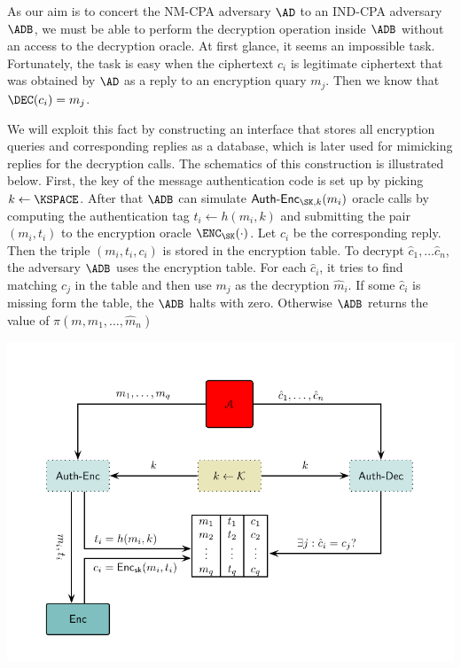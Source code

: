 \documentclass{crypto-exercise}
\newcommand{\AENC}{\mathsf{Auth\text{-}Enc}}
\begin{document}
\begin{solution}
As our aim is to concert the NM-CPA adversary $\AD$ to an IND-CPA adversary $\ADB$, we must be able to perform the decryption operation inside $\ADB$ without an access to the decryption oracle. At first glance, it seems an impossible task. Fortunately, the task is easy when the ciphertext $c_i$ is legitimate ciphertext that was obtained by $\AD$ as a reply to an encryption quary $m_j$. Then we know that $\DEC(c_i)=m_j$.

We will exploit this fact by constructing an interface that stores all encryption queries and corresponding replies as a database, which is later used for mimicking replies for the decryption calls. The schematics of this construction is illustrated below. First, the key of the message authentication code is set up by picking $k\gets\KSPACE$. After that $\ADB$ can simulate $\AENC_{\SK,k}(m_i)$ oracle calls by computing the authentication tag $t_i\gets h(m_i,k)$ and submitting the pair $(m_i,t_i)$ to the encryption oracle $\ENC_\SK(\cdot)$. Let $c_i$ be the corresponding reply. Then the triple $(m_i,t_i,c_i)$ is stored in the encryption table. To decrypt $\hat{c}_1,\ldots\hat{c}_n$, the adversary $\ADB$ uses the encryption table. For each $\hat{c}_i$, it tries to find matching $c_j$ in the table and then use $m_j$ as the decryption $\hat{m}_i$. If some $\hat{c}_i$ is missing form the table, the $\ADB$ halts with zero. Otherwise $\ADB$ returns the value of $\pi(m,\hat{m}_1,\ldots,\hat{m}_n)$

\begin{center}
\includegraphics{figures/0604-decryption-simulator}
\end{center}


\end{solution}
\end{document}
